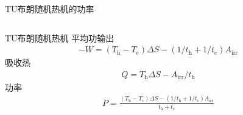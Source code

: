\documentclass{beamer}
\begin{document}
\begin{frame}{TU布朗随机热机的功率}
    \begin{columns}
        \begin{column}{.62\textwidth}
            \begin{block}{TU布朗随机热机}
                \pause
                平均功输出  
                    \begin{equation}
                        \begin{split}
                            -W=\left(T_{\mathrm{h}}-T_{\mathrm{c}}\right) \Delta S-\left({1}/{t_{\mathrm{h}}}+{1}/{t_{\mathrm{c}}}\right) A_{\mathrm{irr}}
                        \end{split} 
                        \label{eq5}
                    \end{equation}
                    \pause
                    吸收热
                    \begin{equation}
                        \begin{split}
                            Q =T_{\mathrm{h}} \Delta S-{A_{\mathrm{irr}}}/{t_{\mathrm{h}}}
                        \end{split}
                        \label{eq6}
                    \end{equation}
                    \pause
                    功率
                    \begin{equation}
                        \begin{split}
                            P=\frac{\left(T_{\mathrm{h}}-T_{\mathrm{c}}\right) \Delta S-\left({1}/{t_{\mathrm{h}}}+{1}/{t_{\mathrm{c}}}\right) A_{\mathrm{irr}}}{t_{\mathrm{h}} + t_{\mathrm{c}}}
                        \end{split}
                        \label{eq7}
                    \end{equation}       
            \end{block}
        \end{column}
    

\end{columns}
\end{frame}
\end{document}
